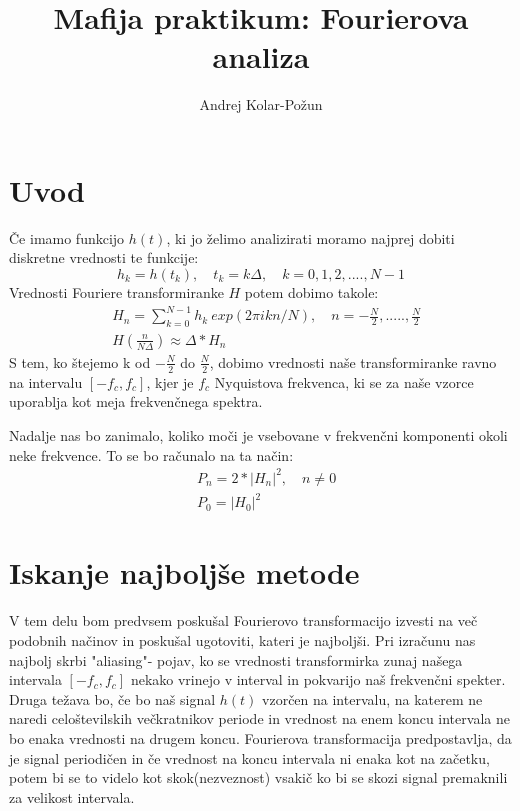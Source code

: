 \documentclass{article}
\title{Mafija praktikum: Fourierova analiza}
\author{Andrej Kolar-Po{\v z}un}
\begin{document}
\maketitle
\newpage
{}

\section{Uvod}
Če imamo funkcijo $h(t)$, ki jo želimo analizirati moramo najprej dobiti diskretne vrednosti te funkcije:
\begin{equation*}
h_k = h(t_k),\quad t_k = k\Delta,\quad k=0, 1, 2, .... , N-1
\end{equation*}
Vrednosti Fouriere transformiranke $H$ potem dobimo takole:
\begin{align*}
&H_n =\sum_{k=0}^{N-1}h_k\ exp(2\pi ikn/N),\quad n=-\frac{N}{2},.....,\frac{N}{2} \\
&H(\frac{n}{N\Delta}) \approx \Delta * H_n
\end{align*}
S tem, ko štejemo k od $-\frac{N}{2}$ do $\frac{N}{2}$, dobimo vrednosti naše transformiranke ravno na intervalu $[-f_c,f_c]$, kjer je
$f_c$ Nyquistova frekvenca, ki se za naše vzorce uporablja kot meja frekvenčnega spektra.

Nadalje nas bo zanimalo, koliko moči je vsebovane v frekvenčni komponenti okoli neke frekvence.
To se bo računalo na ta način:
\begin{align*}
&P_n = 2*|H_n|^2 ,\quad n\neq 0 \\
&P_0 = |H_0|^2
\end{align*}

\section{Iskanje najboljše metode}

V tem delu bom predvsem poskušal Fourierovo transformacijo izvesti na več podobnih načinov in poskušal ugotoviti, kateri je najboljši.
Pri izračunu nas najbolj skrbi "aliasing"- pojav, ko se vrednosti transformirka zunaj našega intervala $[-f_c,f_c]$ nekako vrinejo v interval in pokvarijo naš frekvenčni spekter. Druga težava bo, če bo naš signal $h(t)$ vzorčen na intervalu, na katerem ne naredi celoštevilskih večkratnikov periode in vrednost na enem koncu intervala ne bo enaka vrednosti na drugem koncu. Fourierova transformacija predpostavlja, da je signal periodičen in če vrednost na koncu intervala ni enaka kot na začetku, potem bi se to videlo kot skok(nezveznost) vsakič ko bi se skozi signal premaknili za velikost intervala.
\end{document}
